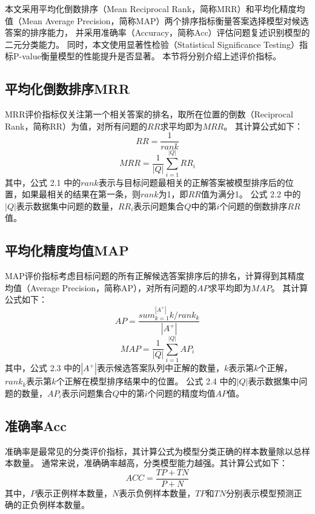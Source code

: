 本文采用平均化倒数排序（Mean Reciprocal Rank，简称MRR）和平均化精度均值（Mean Average Precision，简称MAP）两个排序指标衡量答案选择模型对候选答案的排序能力，
并采用准确率（Accuracy，简称Acc）评估问题复述识别模型的二元分类能力。
同时，本文使用显著性检验（Statistical Significance Testing）\cite{dror2018hitchhiker}指标P-value衡量模型的性能提升是否显著。
本节将分别介绍上述评价指标。

\subsection{平均化倒数排序MRR}

MRR评价指标仅关注第一个相关答案的排名，取所在位置的倒数（Reciprocal Rank，简称RR）为值，对所有问题的$RR$求平均即为$MRR$。
其计算公式如下：
\begin{equation}
    RR = \frac{1}{rank}
\end{equation}
\begin{equation}
    MRR = \frac{1}{|Q|} \sum_{i=1}^{|Q|}RR_i
\end{equation}
其中，公式 2.1 中的$rank$表示与目标问题最相关的正解答案被模型排序后的位置，如果最相关的结果在第一条，则$rank$为1，即$RR$值为满分1。
公式 2.2 中的$|Q|$表示数据集中问题的数量，$RR_i$表示问题集合$Q$中的第$i$个问题的倒数排序$RR$值。

\subsection{平均化精度均值MAP}

MAP评价指标考虑目标问题的所有正解候选答案排序后的排名，计算得到其精度均值（Average Precision，简称AP），对所有问题的$AP$求平均即为$MAP$。
其计算公式如下：
\begin{equation}
    AP = \frac{sum_{k=1}^{|A^+|}k/rank_k}{|A^+|}
\end{equation}
\begin{equation}
    MAP = \frac{1}{|Q|} \sum_{i=1}^{|Q|}AP_i
\end{equation}
其中，公式 2.3 中的$|A^+|$表示候选答案队列中正解的数量，$k$表示第$k$个正解，$rank_k$表示第$k$个正解在模型排序结果中的位置。
公式 2.4 中的$|Q|$表示数据集中问题的数量，$AP_i$表示问题集合$Q$中的第$i$个问题的精度均值$AP$值。

\subsection{准确率Acc}

准确率是最常见的分类评价指标，其计算公式为模型分类正确的样本数量除以总样本数量。
通常来说，准确确率越高，分类模型能力越强。其计算公式如下：
\begin{equation}
    ACC = \frac{TP + TN}{P + N}
\end{equation}
其中，$P$表示正例样本数量，$N$表示负例样本数量，$TP$和$TN$分别表示模型预测正确的正负例样本数量。


